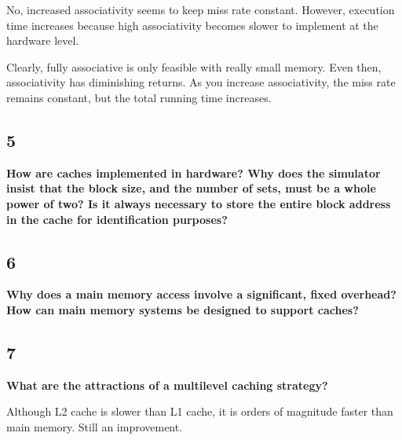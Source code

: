 \documentclass[letterpaper, 12pt, oneside]{memoir}
\begin{document}
No, increased associativity seems to keep miss rate constant. However, execution
time increases because high associativity becomes slower to implement at 
the hardware level.

Clearly, fully associative is only feasible with really small memory. Even then, 
associativity has diminishing returns. As you increase associativity, the miss
rate remains constant, but the total running time increases.

\subsection{5}
\textbf{How are caches implemented in hardware? Why does the simulator insist
that the block size, and the number of sets, must be a whole power of two? Is it always
necessary to store the entire block address in the cache for identification
purposes?}


\subsection{6}
\textbf{Why does a main memory access involve a significant, fixed overhead? How
can main memory systems be designed to support caches?}


\subsection{7}
\textbf{What are the attractions of a multilevel caching strategy?}

Although L2 cache is slower than L1 cache, it is orders of magnitude faster
than main memory. Still an improvement.
\end{document}
